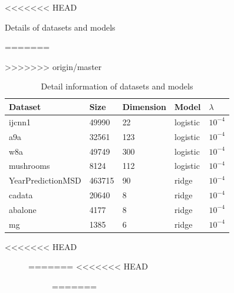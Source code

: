 \documentclass[conference]{IEEEtran}
\begin{document}
\begin{algorithm}[t]
\begin{itemize}
 
 \begin{table}
\centering
<<<<<<< HEAD
\caption{Details of datasets and models}
=======
\caption{Detail information of datasets and models}
>>>>>>> origin/master
\label{data_information}
\begin{tabular}{|l|l|l|l|l|}
\hline
Dataset           & Size & Dimension & Model & $\lambda$ \\ \hline
ijcnn1            &  49990 &  22 &   logistic    &  $10^{-4}$         \\
a9a               &   32561&123   &     logistic  &      $10^{-4}$     \\ 
w8a               &  49749 & 300   &  logistic &  $10^{-4}$     \\ 
mushrooms   &   8124     &112    & logistic   &  $10^{-4}$     \\ 
YearPredictionMSD & 463715  &  90 &    ridge  &      $10^{-4}$     \\
cadata              & 20640  &8   &     ridge  &    $10^{-4}$       \\ 
abalone          & 4177  & 8 &   ridge&   $10^{-4}$       \\ 
mg             &1385 &6 & ridge&  $10^{-4}$     \\ \hline
\end{tabular}
\end{table}
<<<<<<< HEAD
 
 \begin{figure}[ht]
=======
<<<<<<< HEAD
 
 \begin{figure}[ht]
=======



\end{figure}
\end{figure}
\end{itemize}
\end{algorithm}
\end{document}
